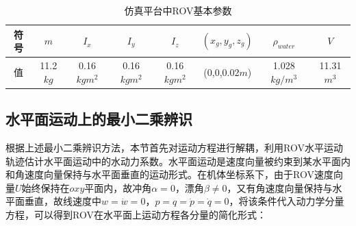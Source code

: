 \begin{table}[htb]
  \centering
  \caption{仿真平台中ROV基本参数}
  \label{t.rov_base_params}
\begin{tabular}{cccccccc}
\hline
符号 & $m$  & $I_x$ & $I_y$ & $I_z$ & $(x_g,y_g,z_g)$ & $\rho_{water}$ & $V$   \\
\hline
值  & 11.2$kg$ & 0.16$kg m^2$  & 0.16$kg m^2$  & 0.16$kg m^2$  & (0,0,0.02$m$)      & 1.028$kg/m^3$        & 11.31$m^3$  \\
\hline
\end{tabular}
\end{table}

\subsection{水平面运动上的最小二乘辨识}
根据上述最小二乘辨识方法，本节首先对运动方程进行解耦，利用ROV水平运动轨迹估计水平面运动中的水动力系数。水平面运动是速度向量被约束到某水平面内和角速度向量保持与水平面垂直的运动形式。在机体坐标系下，由于ROV速度向量$U$始终保持在$oxy$平面内，故冲角$\alpha = 0$，漂角$\beta \ne 0$，又有角速度向量保持与水平面垂直，故线速度中$w=\dot{w}=0$，$p=q=\dot{p}=\dot{q}=0$，将该条件代入动力学分量方程，可以得到ROV在水平面上运动方程各分量的简化形式：


